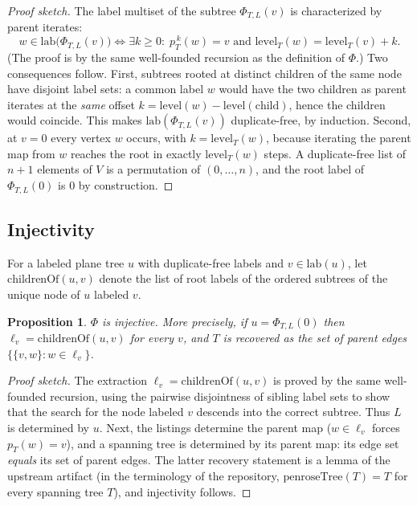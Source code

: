 \documentclass[11pt]{article}
\newtheorem{proposition}[theorem]{Proposition}
\theoremstyle{remark}
\theoremstyle{definition}
\begin{document}
\begin{proof}[Proof sketch]
The label multiset of the subtree $\Phi_{T,L}(v)$ is characterized by parent
iterates:
\[
  w \in \mathrm{lab}\bigl(\Phi_{T,L}(v)\bigr)
  \iff
  \exists k \ge 0 : \; p_T^{\,k}(w) = v
  \text{ and } \mathrm{level}_T(w) = \mathrm{level}_T(v) + k .
\]
(The proof is by the same well-founded recursion as the definition of
$\Phi$.)  Two consequences follow.  First, subtrees rooted at distinct
children of the same node have disjoint label sets: a common label $w$ would
have the two children as parent iterates at the \emph{same} offset
$k = \mathrm{level}(w) - \mathrm{level}(\text{child})$, hence the children
would coincide.  This makes $\mathrm{lab}(\Phi_{T,L}(v))$ duplicate-free, by
induction.  Second, at $v = 0$ every vertex $w$ occurs, with
$k = \mathrm{level}_T(w)$, because iterating the parent map from $w$ reaches
the root in exactly $\mathrm{level}_T(w)$ steps.  A duplicate-free list of
$n+1$ elements of $V$ is a permutation of $(0,\dots,n)$, and the root label of
$\Phi_{T,L}(0)$ is $0$ by construction.
\end{proof}

\subsection{Injectivity}

For a labeled plane tree $u$ with duplicate-free labels and $v \in
\mathrm{lab}(u)$, let $\mathrm{childrenOf}(u,v)$ denote the list of root
labels of the ordered subtrees of the unique node of $u$ labeled $v$.

\begin{proposition}\label{prop:inj}
$\Phi$ is injective.  More precisely, if $u = \Phi_{T,L}(0)$ then
$\ell_v = \mathrm{childrenOf}(u,v)$ for every $v$, and $T$ is recovered as the
set of parent edges $\{\{v, w\} : w \in \ell_v\}$.
\end{proposition}

\begin{proof}[Proof sketch]
The extraction $\ell_v = \mathrm{childrenOf}(u,v)$ is proved by the same
well-founded recursion, using the pairwise disjointness of sibling label sets
to show that the search for the node labeled $v$ descends into the correct
subtree.  Thus $L$ is determined by $u$.  Next, the listings determine the
parent map ($w \in \ell_v$ forces $p_T(w) = v$), and a spanning tree is
determined by its parent map: its edge set \emph{equals} its set of parent
edges.  The latter recovery statement is a lemma of the upstream artifact (in
the terminology of the repository, $\mathrm{penroseTree}(T) = T$ for every
spanning tree $T$), and injectivity follows.
\end{proof}
\end{document}
